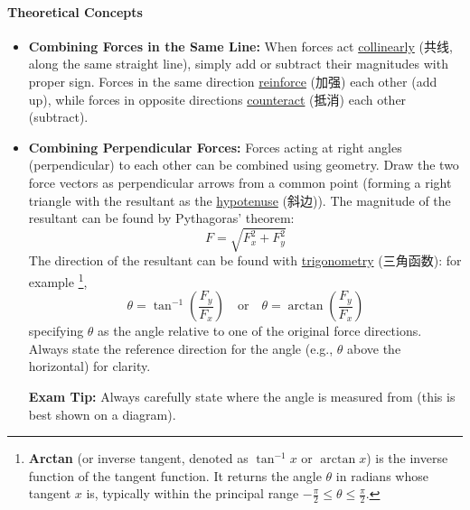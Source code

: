 \paragraph{Theoretical Concepts}
\begin{itemize}
    \item \textbf{Combining Forces in the Same Line:} When forces act \underline{collinearly} (共线, along the same straight line),
    simply add or subtract their magnitudes with proper sign. Forces in the same direction \underline{reinforce} (加强) each other
    (add up), while forces in opposite directions \underline{counteract} (抵消) each other (subtract).
    \item \textbf{Combining Perpendicular Forces:} Forces acting at right angles (perpendicular) to each other can be combined
    using geometry. Draw the two force vectors as perpendicular arrows from a common point (forming a right triangle with the
    resultant as the \underline{hypotenuse} (斜边)). The magnitude of the resultant can be found by Pythagoras' theorem:
    \begin{equation}
        F = \sqrt{F_x^2 + F_y^2}
    \end{equation}
    The direction of the resultant can be found with \underline{trigonometry} (三角函数): for example \footnote{\textbf{Arctan}
    (or inverse tangent, denoted as $\tan^{-1} x$ or $\arctan x$) is the inverse function of the tangent function. It returns
    the angle $\theta$ in radians whose tangent $x$ is, typically within the principal range
    $-\frac{\pi}{2} \leq \theta \leq \frac{\pi}{2}$.},
    \begin{equation}
        \theta = \tan^{-1} \left( \frac{F_y}{F_x} \right) \quad \text{or} \quad \theta = \arctan \left( \frac{F_y}{F_x} \right)
    \end{equation}
    specifying $\theta$ as the angle relative to one of the original force directions. Always state the reference direction for
    the angle (e.g., $\theta$ above the horizontal) for clarity. \par
    \textbf{Exam Tip:} Always carefully state where the angle is measured from (this is best shown on a diagram).
\end{itemize}

